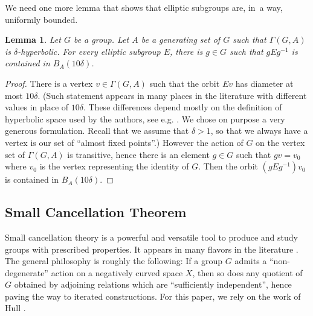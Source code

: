 \documentclass[JEP,XML,SOM,Unicode]{cedram}
\newtheorem{lemma}[theorem]{Lemma}
\theoremstyle{definition}
\begin{document}
We need one more lemma that shows that elliptic subgroups are, in~a way, uniformly bounded.

\begin{lemma}
\label{lem:elliptic}
Let $G$ be a group.
Let $A$ be a generating set of $G$ such that $\Gamma(G,A)$ is $\delta$-hyperbolic.
For every elliptic subgroup $E$, there is $g \in G$ such that $gEg^{-1}$ is contained in $B_A(10\delta)$.
\end{lemma}

\begin{proof}
There is a vertex $v \in \Gamma(G, A)$ such that the orbit $Ev$ has diameter at most $10\delta$. (Such statement appears in many places in the literature with different values in place of $10\delta$. These differences depend mostly on the definition of hyperbolic space used by the authors, see e.g. \cite[III.$\Gamma$, Lem.\,3.3]{BH}. We chose on purpose a very generous formulation. Recall that we assume that $\delta > 1$, so that we always have a vertex is our set of ``almost fixed points''.)
However the action of $G$ on the vertex set of $\Gamma(G,A)$ is transitive, hence there is an element $g \in G$ such that $gv = v_0$ where $v_0$ is the vertex representing the identity of $G$.
Then the orbit $(g E g^{-1}) v_0$ is contained in $B_A(10 \delta)$.
\end{proof}

\subsection{Small Cancellation Theorem}

Small cancellation theory is a powerful and versatile tool to produce and study groups with prescribed properties.
It appears in many flavors in the literature \cite{Lyndon:2001wm,Olshanskii:1991wv, Gromov:2001us, Osin:2010dx, Coulon:2014fr,DGO}.
The general philosophy is roughly the following: If a group $G$ admits a ``non-degenerate'' action on a negatively curved space $X$, then so does any quotient of $G$ obtained by adjoining relations which are ``sufficiently independent'', hence paving the way to iterated constructions.
For this paper, we rely on the work of Hull \cite{hull}.
\end{document}
